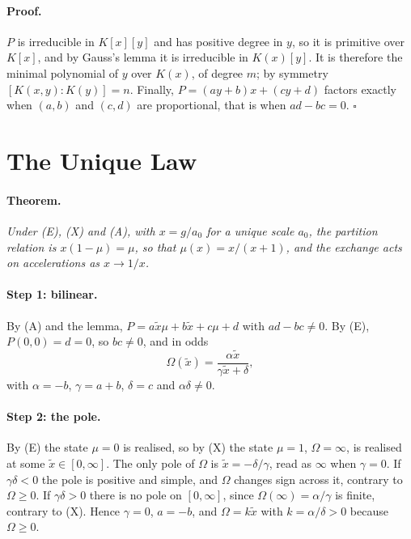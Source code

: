 \documentclass[twocolumn]{iopjournal}
\begin{document}
\paragraph{Proof.} $P$ is irreducible in $K[x][y]$ and has positive
degree in $y$, so it is primitive over $K[x]$, and by Gauss's lemma
it is irreducible in $K(x)[y]$. It is therefore the minimal
polynomial of $y$ over $K(x)$, of degree $m$; by symmetry
$[K(x,y):K(y)] = n$. Finally, $P = (ay + b)x + (cy + d)$ factors
exactly when $(a,b)$ and $(c,d)$ are proportional, that is when
$ad - bc = 0$.
\hfill $\square$


\section*{The Unique Law}

\paragraph{Theorem.} \textit{Under (E), (X) and (A), with
$x = g/a_0$ for a unique scale $a_0$, the partition relation is
$x(1-\mu) = \mu$, so that $\mu(x) = x/(x+1)$, and the exchange acts
on accelerations as $x \to 1/x$.}

\paragraph{Step 1: bilinear.} By (A) and the lemma,
$P = a\tilde x\mu + b\tilde x + c\mu + d$ with $ad - bc \neq 0$. By
(E), $P(0,0) = d = 0$, so $bc \neq 0$, and in odds
\begin{equation}
  \Omega(\tilde x) = \frac{\alpha \tilde x}{\gamma \tilde x + \delta},
\end{equation}
with $\alpha = -b$, $\gamma = a + b$, $\delta = c$ and
$\alpha\delta \neq 0$.

\paragraph{Step 2: the pole.} By (E) the state $\mu = 0$ is realised,
so by (X) the state $\mu = 1$, $\Omega = \infty$, is realised at
some $\tilde x \in [0,\infty]$. The only pole of $\Omega$ is
$\tilde x = -\delta/\gamma$, read as $\infty$ when $\gamma = 0$. If
$\gamma\delta < 0$ the pole is positive and simple, and $\Omega$
changes sign across it, contrary to $\Omega \ge 0$. If
$\gamma\delta > 0$ there is no pole on $[0,\infty]$, since
$\Omega(\infty) = \alpha/\gamma$ is finite, contrary to (X). Hence
$\gamma = 0$, $a = -b$, and $\Omega = k\tilde x$ with
$k = \alpha/\delta > 0$ because $\Omega \ge 0$.
\end{document}
